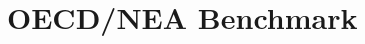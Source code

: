 \documentclass[11pt,letterpaper]{article}
\begin{document}
\section{OECD/NEA Benchmark}






\end{document}
